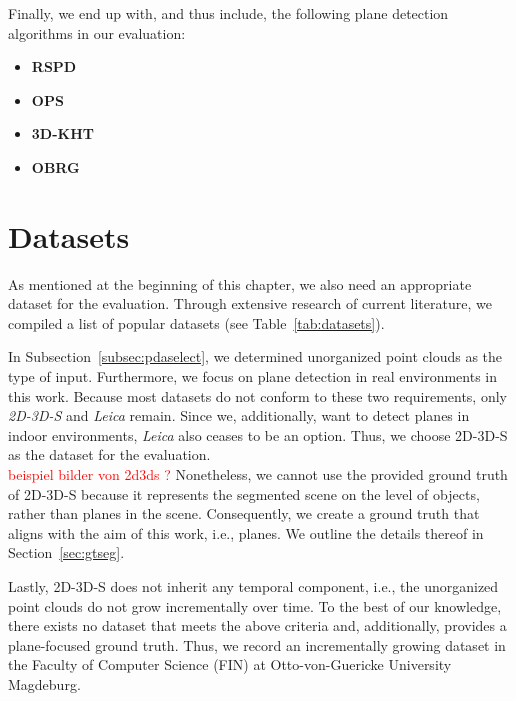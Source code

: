 \documentclass[main.tex]{subfiles}
\begin{document}
Finally, we end up with, and thus include, the following plane detection algorithms in our evaluation:

\begin{itemize}
    \item \textbf{RSPD}
    \item \textbf{OPS}
    \item \textbf{3D-KHT}
    \item \textbf{OBRG}
\end{itemize}

\section{Datasets}
\label{sec:datasets}
As mentioned at the beginning of this chapter, we also need an appropriate dataset for the evaluation.
Through extensive research of current literature, we compiled a list of popular datasets (see Table~\ref{tab:datasets}).

In Subsection~\ref{subsec:pdaselect}, we determined unorganized point clouds as the type of input. Furthermore, we focus on plane detection in real environments in this work.
Because most datasets do not conform to these two requirements, only \textit{2D-3D-S} and \textit{Leica} remain. Since we, additionally, want to detect planes in indoor environments, 
\textit{Leica} also ceases to be an option. Thus, we choose 2D-3D-S as the dataset for the evaluation.
\textcolor{red}{\\beispiel bilder von 2d3ds ?}\newline
Nonetheless, we cannot use the provided ground truth of 2D-3D-S because it represents the segmented scene on the level of objects, rather than planes in the scene.
Consequently, we create a ground truth that aligns with the aim of this work, i.e., planes. We outline the details thereof in Section~\ref{sec:gtseg}.  

Lastly, 2D-3D-S does not inherit any temporal component, i.e., the unorganized point clouds do not grow incrementally over time. 
To the best of our knowledge, there exists no dataset that meets the above criteria and, additionally, provides a plane-focused ground truth. 
Thus, we record an incrementally growing dataset in the Faculty of Computer Science (FIN) at Otto-von-Guericke University Magdeburg.
\end{document}

